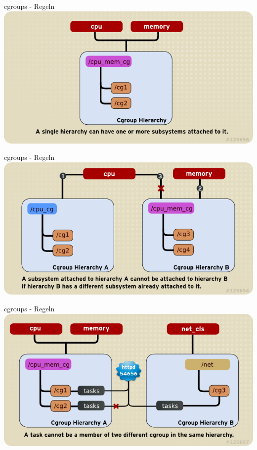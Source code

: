 \documentclass[14pt]{beamer}
\begin{document}
    \begin{frame}{cgroups - Regeln}
    \centering\includegraphics[scale=0.7]{logo/RMG-rule1}
    \end{frame}
    \begin{frame}{cgroups - Regeln}
    \centering\includegraphics[scale=0.7]{logo/RMG-rule2}
    \end{frame}
    \begin{frame}{cgroups - Regeln}
    \centering\includegraphics[scale=0.7]{logo/RMG-rule3}
    \end{frame}
\end{document}
